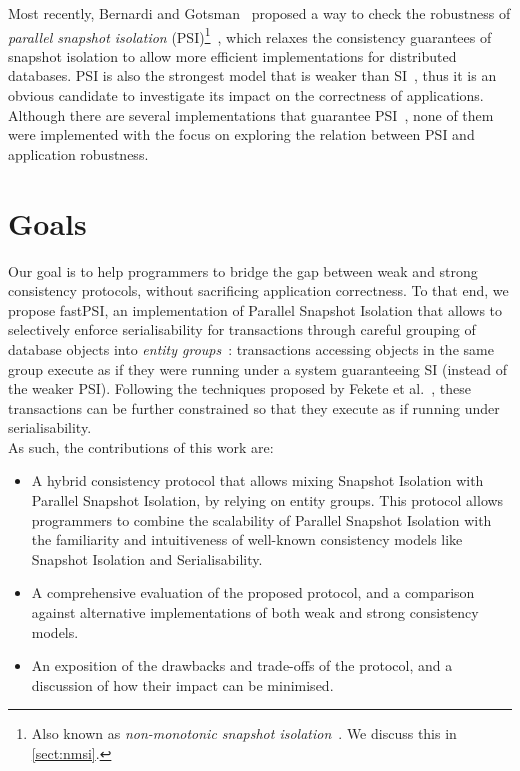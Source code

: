 Most recently, Bernardi and Gotsman~\citep{concur_robustness} proposed a way to check the robustness of \emph{parallel snapshot isolation} (PSI)\footnote{Also known as \emph{non-monotonic snapshot isolation}~\citep{ardekani_nmsi}. We discuss this in \textsection\ref{sect:nmsi}.}~\citep{psi-intro}, which relaxes the consistency guarantees of snapshot isolation to allow more efficient implementations for distributed databases. PSI is also the strongest model that is weaker than SI~\citep{concur_framework}, thus it is an obvious candidate to investigate its impact on the correctness of applications. Although there are several implementations that guarantee PSI~\citep{psi-intro, ardekani_nmsi, moniz_blotter}, none of them were implemented with the focus on exploring the relation between PSI and application robustness.

\section{Goals}

Our goal is to help programmers to bridge the gap between weak and strong consistency protocols, without sacrificing application correctness. To that end, we propose fastPSI, an implementation of Parallel Snapshot Isolation that allows to selectively enforce serialisability for transactions through careful grouping of database objects into \emph{entity groups}~\citep{baker_megastore}: transactions accessing objects in the same group execute as if they were running under a system guaranteeing SI (instead of the weaker PSI). Following the techniques proposed by Fekete et al.~\citep{fekete_ssi}, these transactions can be further constrained so that they execute as if running under serialisability.\\

As such, the contributions of this work are:

\begin{itemize}
    \item A hybrid consistency protocol that allows mixing Snapshot Isolation with Parallel Snapshot Isolation, by relying on entity groups. This protocol allows programmers to combine the scalability of Parallel Snapshot Isolation with the familiarity and intuitiveness of well-known consistency models like Snapshot Isolation and Serialisability.

    \item A comprehensive evaluation of the proposed protocol, and a comparison against alternative implementations of both weak and strong consistency models.

    \item An exposition of the drawbacks and trade-offs of the protocol, and a discussion of how their impact can be minimised.
\end{itemize}

